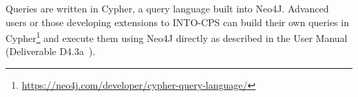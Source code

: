 Queries are written in Cypher, a query language built into Neo4J. Advanced users or those developing extensions to INTO-CPS can build their own queries in Cypher\footnote{\url{https://neo4j.com/developer/cypher-query-language/}} and execute them using Neo4J directly as described in the User Manual (Deliverable D4.3a~\cite{INTOCPSD4.3a}). 